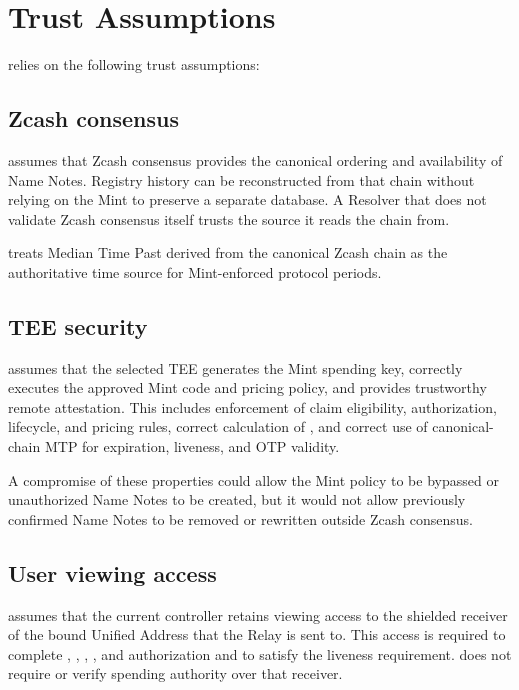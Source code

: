 \section{Trust Assumptions}
\label{sec:trust-assumptions}

\zns{} relies on the following trust assumptions:

\subsection{Zcash consensus}

\zns{} assumes that Zcash consensus provides the canonical ordering and availability of Name Notes. Registry history can be reconstructed from that chain without relying on the Mint to preserve a separate database. A Resolver that does not validate Zcash consensus itself trusts the source it reads the chain from.

\zns{} treats Median Time Past derived from the canonical Zcash chain as the authoritative time source for Mint-enforced protocol periods.

\subsection{TEE security}

\zns{} assumes that the selected TEE generates the Mint spending key, correctly executes the approved Mint code and pricing policy, and provides trustworthy remote attestation. This includes enforcement of claim eligibility, authorization, lifecycle, and pricing rules, correct calculation of , and correct use of canonical-chain MTP for expiration, liveness, and OTP validity.

A compromise of these properties could allow the Mint policy to be bypassed or unauthorized Name Notes to be created, but it would not allow previously confirmed Name Notes to be removed or rewritten outside Zcash consensus.

\subsection{User viewing access}

\zns{} assumes that the current controller retains viewing access to the shielded receiver of the bound Unified Address that the Relay is sent to. This access is required to complete , , , , and  authorization and to satisfy the liveness requirement. \zns{} does not require or verify spending authority over that receiver.

